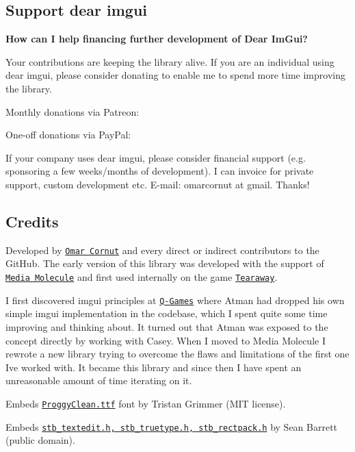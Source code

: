 \subsection*{Support dear imgui }

{\bfseries How can I help financing further development of Dear Im\+Gui?}

Your contributions are keeping the library alive. If you are an individual using dear imgui, please consider donating to enable me to spend more time improving the library.

Monthly donations via Patreon\+: ~\newline
\href{http://www.patreon.com/imgui}{\tt }

One-\/off donations via Pay\+Pal\+: ~\newline
\href{https://www.paypal.com/cgi-bin/webscr?cmd=_s-xclick&hosted_button_id=5Q73FPZ9C526U}{\tt }

If your company uses dear imgui, please consider financial support (e.\+g. sponsoring a few weeks/months of development). I can invoice for private support, custom development etc. E-\/mail\+: omarcornut at gmail. Thanks!

\subsection*{Credits }

Developed by \href{http://www.miracleworld.net}{\tt Omar Cornut} and every direct or indirect contributors to the Git\+Hub. The early version of this library was developed with the support of \href{http://www.mediamolecule.com}{\tt Media Molecule} and first used internally on the game \href{http://tearaway.mediamolecule.com}{\tt Tearaway}.

I first discovered imgui principles at \href{http://www.q-games.com}{\tt Q-\/\+Games} where Atman had dropped his own simple imgui implementation in the codebase, which I spent quite some time improving and thinking about. It turned out that Atman was exposed to the concept directly by working with Casey. When I moved to Media Molecule I rewrote a new library trying to overcome the flaws and limitations of the first one I\textquotesingle{}ve worked with. It became this library and since then I have spent an unreasonable amount of time iterating on it.

Embeds \href{http://upperbounds.net}{\tt Proggy\+Clean.\+ttf} font by Tristan Grimmer (M\+IT license).

Embeds \href{https://github.com/nothings/stb/}{\tt stb\+\_\+textedit.\+h, stb\+\_\+truetype.\+h, stb\+\_\+rectpack.\+h} by Sean Barrett (public domain).

